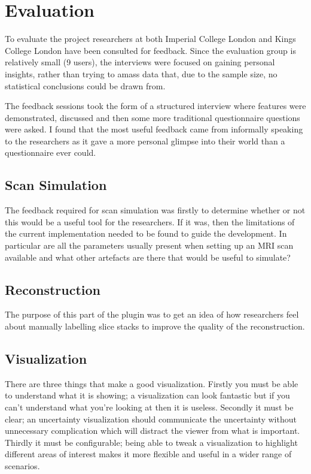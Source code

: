 \chapter{Evaluation}\label{chapter:evaluation}

To evaluate the project researchers at both Imperial College London and Kings College London have been consulted for feedback. Since the evaluation group is relatively small (9 users), the interviews were focused on gaining personal insights, rather than trying to amass data that, due to the sample size, no statistical conclusions could be drawn from.

The feedback sessions took the form of a structured interview where features were demonstrated, discussed and then some more traditional questionnaire questions were asked. I found that the most useful feedback came from informally speaking to the researchers as it gave a more personal glimpse into their world than a questionnaire ever could.

\section{Scan Simulation}\label{evaluation:scan_simulation}
The feedback required for scan simulation was firstly to determine whether or not this would be a useful tool for the researchers. If it was, then the limitations of the current implementation needed to be found to guide the development. In particular are all the parameters usually present when setting up an MRI scan available and what other artefacts are there that would be useful to simulate?

\section{Reconstruction}\label{evaluation:reconstruction}
The purpose of this part of the plugin was to get an idea of how researchers feel about manually labelling slice stacks to improve the quality of the reconstruction. 

\section{Visualization}\label{results:visualization}
There are three things that make a good visualization. Firstly you must be able to understand what it is showing; a visualization can look fantastic but if you can't understand what you're looking at then it is useless. Secondly it must be clear; an uncertainty visualization should communicate the uncertainty without unnecessary complication which will distract the viewer from what is important. Thirdly it must be configurable; being able to tweak a visualization to highlight different areas of interest makes it more flexible and useful in a wider range of scenarios.